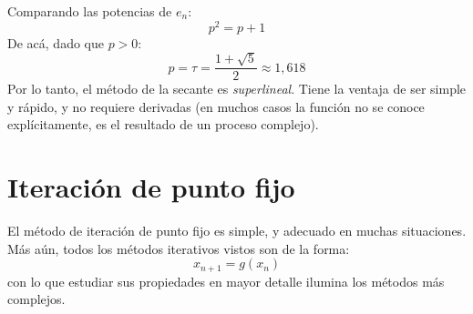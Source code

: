   Comparando las potencias de \(e_n\):
  \begin{equation*}
    p^2
      = p + 1
  \end{equation*}
  De acá,
  dado que \(p > 0\):
  \begin{equation*}
    p
      = \tau
      = \frac{1 + \sqrt{5}}{2}
      \approx 1,618
  \end{equation*}
  Por lo tanto,
  el método de la secante es \emph{superlineal}.
  Tiene la ventaja de ser simple y rápido,
  y no requiere derivadas
  (en muchos casos la función no se conoce explícitamente,
   es el resultado de un proceso complejo).

\section{Iteración de punto fijo}
\label{sec:FPI}

  El método de iteración de punto fijo es simple,
  y adecuado en muchas situaciones.
  Más aún,
  todos los métodos iterativos vistos son de la forma:
  \begin{equation*}
    x_{n + 1}
      = g(x_n)
  \end{equation*}
  con lo que estudiar sus propiedades en mayor detalle
  ilumina los métodos más complejos.

